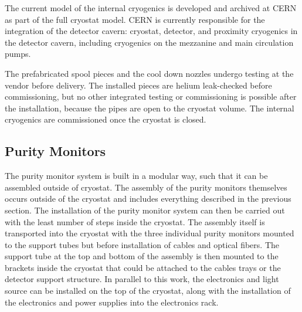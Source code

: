 The current \threed model of the internal cryogenics is developed and archived at CERN as part of the full cryostat model. CERN is currently responsible for the integration of the detector cavern: cryostat, detector, and proximity cryogenics in the detector cavern, including cryogenics on the mezzanine and main \lar circulation pumps.

The prefabricated spool pieces and the cool down nozzles undergo testing at the vendor  before delivery. The installed pieces are helium leak-checked before commissioning, but no other integrated testing or commissioning is possible after the installation, because the pipes are open to the cryostat volume. The internal cryogenics are commissioned once the cryostat is closed.


\subsection{Purity Monitors}
\label{sec:fdgen-slow-cryo-instal-pm}

The purity monitor system is built in a modular way, such that it can be assembled outside of  cryostat.  The assembly of the purity monitors themselves occurs outside of the cryostat and includes everything described in the previous section.  The installation of the purity monitor system can then be carried out with the least number of steps inside the cryostat.  The assembly itself is transported into the cryostat with the three individual purity monitors mounted to the support tubes but before installation of  cables and optical fibers. The support tube at the top and bottom of the assembly is then mounted to the brackets inside the cryostat that could be attached to the cables trays or the detector support structure.  In parallel to this work, the  electronics and light source can be installed on the top of the cryostat, along with the installation of the electronics and power supplies into the electronics rack.  

